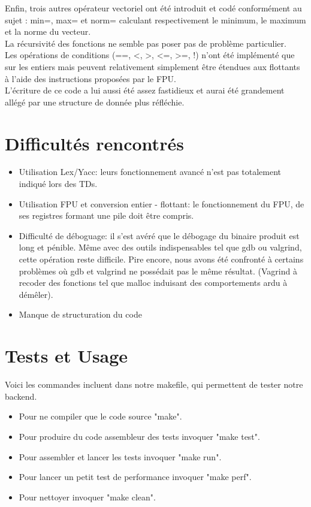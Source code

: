 \documentclass[a4paper, 11pt]{article}
\begin{document}
Enfin, trois autres opérateur vectoriel ont été introduit et codé conformément au sujet : min=, max= et norm= calculant respectivement
le minimum, le maximum et la norme du vecteur.\\

La récursivité des fonctions ne semble pas poser pas de problème particulier.\\

Les opérations de conditions (==, <, >, <=, >=, !) n'ont été implémenté que sur les entiers mais peuvent relativement simplement être étendues
aux flottants à l'aide des instructions proposées par le FPU.\\

L'écriture de ce code a lui aussi été assez fastidieux et aurai été grandement allégé par une structure de donnée plus réfléchie.

\section{Difficultés rencontrés}
\begin{itemize}
\item Utilisation Lex/Yacc: leurs fonctionnement avancé n'est pas totalement indiqué lors des TDs.
\item Utilisation FPU et conversion entier - flottant: le fonctionnement du FPU, de ses registres formant une pile doit être compris.
\item Difficulté de déboguage: il s'est avéré que le débogage du binaire produit est long et pénible. Même avec des outils indispensables tel que gdb ou valgrind, cette opération reste difficile. Pire encore, nous avons été confronté à certains problèmes où gdb et valgrind ne possédait
pas le même résultat. (Vagrind à recoder des fonctions tel que malloc induisant des comportements ardu à démêler).
\item Manque de structuration du code
\end{itemize}

\section{Tests et Usage}

Voici les commandes incluent dans notre makefile, qui permettent de tester notre backend.
\begin{itemize}
\item Pour ne compiler que le code source "make".
\item Pour produire du code assembleur des tests invoquer "make test".
\item Pour assembler et lancer les tests invoquer "make run".
\item Pour lancer un petit test de performance invoquer "make perf".
\item Pour nettoyer invoquer "make clean".
\end{itemize}
\end{document}

